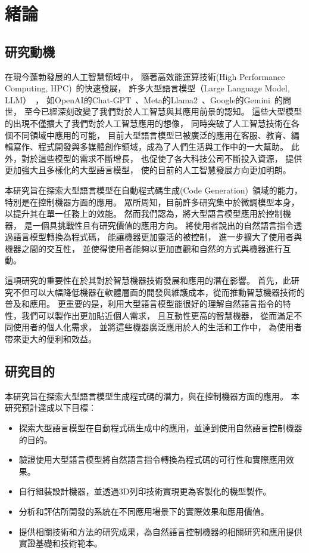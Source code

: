 \documentclass[class=NCU_thesis, crop=false]{standalone}
\begin{document}
\chapter{緒論}
\section{研究動機}

在現今蓬勃發展的人工智慧領域中，
隨著高效能運算技術(High Performance Computing, HPC)~\cite{reed2022reinventing}的快速發展，
許多大型語言模型（Large Language Model, LLM）~\cite{zhao2023survey}，
如OpenAI的Chat-GPT~\cite{Liu_2023}、Meta的Llama2~\cite{touvron2023llama}、Google的Gemini~\cite{geminiteam2024gemini}的問世，
至今已經深刻改變了我們對於人工智慧與其應用前景的認知。
這些大型模型的出現不僅擴大了我們對於人工智慧應用的想像，
同時突破了人工智慧技術在各個不同領域中應用的可能，
目前大型語言模型已被廣泛的應用在客服、教育、編輯寫作、程式開發與多媒體創作領域，成為了人們生活與工作中的一大幫助。
此外，對於這些模型的需求不斷增長，
也促使了各大科技公司不斷投入資源，
提供更加強大且多樣化的大型語言模型，
使的目前的人工智慧發展方向更加明朗。

本研究旨在探索大型語言模型在自動程式碼生成(Code Generation)~\cite{10196869}領域的能力，
特別是在控制機器方面的應用。
眾所周知，目前許多研究集中於微調模型本身，
以提升其在單一任務上的效能。
然而我們認為，將大型語言模型應用於控制機器，
是一個具挑戰性且有研究價值的應用方向。
將使用者說出的自然語言指令透過語言模型轉換為程式碼，
能讓機器更加靈活的被控制，
進一步擴大了使用者與機器之間的交互性，
並使得使用者能夠以更加直觀和自然的方式與機器進行互動。

這項研究的重要性在於其對於智慧機器技術發展和應用的潛在影響。
首先，此研究不但可以大幅降低機器在軟體層面的開發與維護成本，從而推動智慧機器技術的普及和應用。
更重要的是，利用大型語言模型能很好的理解自然語言指令的特性，我們可以製作出更加貼近個人需求，
且互動性更高的智慧機器，
從而滿足不同使用者的個人化需求，
並將這些機器廣泛應用於人的生活和工作中，
為使用者帶來更大的便利和效益。

\section{研究目的}

本研究旨在探索大型語言模型生成程式碼的潛力，與在控制機器方面的應用。
本研究預計達成以下目標：
\begin{itemize}

    \item 探索大型語言模型在自動程式碼生成中的應用，並達到使用自然語言控制機器的目的。

    \item 驗證使用大型語言模型將自然語言指令轉換為程式碼的可行性和實際應用效果。

    \item 自行組裝設計機器，並透過3D列印技術實現更為客製化的機型製作。

    \item 分析和評估所開發的系統在不同應用場景下的實際效果和應用價值。

    \item 提供相關技術和方法的研究成果，為自然語言控制機器的相關研究和應用提供實證基礎和技術範本。
\end{itemize}
\end{document}
